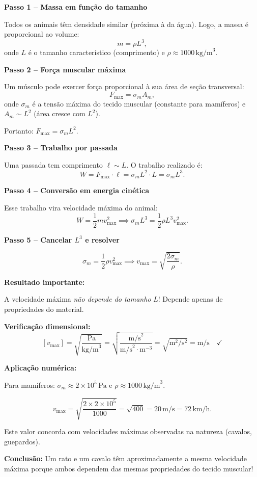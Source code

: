 
\textbf{Passo 1 – Massa em função do tamanho}

Todos os animais têm densidade similar (próxima à da água). Logo, a massa é proporcional ao volume:
\[
m = \rho L^3,
\]
onde $L$ é o tamanho característico (comprimento) e $\rho \approx 1000\,\text{kg/m}^3$.

\textbf{Passo 2 – Força muscular máxima}

Um músculo pode exercer força proporcional à sua área de seção transversal:
\[
F_{\max} = \sigma_m A_m,
\]
onde $\sigma_m$ é a tensão máxima do tecido muscular (constante para mamíferos) e $A_m \sim L^2$ (área cresce com $L^2$).

Portanto: $F_{\max} = \sigma_m L^2$.

\textbf{Passo 3 – Trabalho por passada}

Uma passada tem comprimento $\ell \sim L$. O trabalho realizado é:
\[
W = F_{\max} \cdot \ell = \sigma_m L^2 \cdot L = \sigma_m L^3.
\]

\textbf{Passo 4 – Conversão em energia cinética}

Esse trabalho vira velocidade máxima do animal:
\[
W = \frac{1}{2}m v_{\max}^2
\implies
\sigma_m L^3 = \frac{1}{2}\rho L^3 v_{\max}^2.
\]

\textbf{Passo 5 – Cancelar $L^3$ e resolver}

\[
\sigma_m = \frac{1}{2}\rho v_{\max}^2
\implies
v_{\max} = \sqrt{\frac{2\sigma_m}{\rho}}.
\]

\textbf{Resultado importante:}

A velocidade máxima \emph{não depende do tamanho} $L$! Depende apenas de propriedades do material.

\textbf{Verificação dimensional:}
\[
[v_{\max}] = \sqrt{\frac{\text{Pa}}{\text{kg/m}^3}} = \sqrt{\frac{\text{m/s}^2}{\text{m/s}^2 \cdot \text{m}^{-3}}} = \sqrt{\text{m}^2/\text{s}^2} = \text{m/s}\quad\checkmark
\]

\textbf{Aplicação numérica:}

Para mamíferos: $\sigma_m \approx 2\times10^5\,\text{Pa}$ e $\rho \approx 1000\,\text{kg/m}^3$.

\[
v_{\max} = \sqrt{\frac{2 \times 2\times10^5}{1000}} = \sqrt{400} = 20\,\text{m/s} = 72\,\text{km/h}.
\]

Este valor concorda com velocidades máximas observadas na natureza (cavalos, guepardos).

\textbf{Conclusão:} Um rato e um cavalo têm aproximadamente a mesma velocidade máxima porque ambos dependem das mesmas propriedades do tecido muscular!

